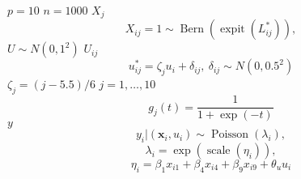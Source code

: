 \documentclass{article}
\begin{document}
$p=10$
$n=1000$
$X_j$
$$
X_{ij}=1 \sim \operatorname{Bern}(\operatorname{expit}(L^*_{ij})), 
$$
$U \sim N(0, 1^2)$
$U_{ij}$
$$
u^*_{ij}=\zeta_j u_i +\delta_{ij}, \ \delta_{ij} \sim N(0, 0.5^2)
$$
$\zeta_j = (j-5.5)/6$
$j=1, \ldots, 10$
$$
g_j(t) = \frac{1}{1+\exp\left(- t\right)}
$$
$y$
$$
y_i|(\mathbf{x}_i, u_i) \sim \operatorname{Poisson}(\lambda_i),
$$
$$
\lambda_i = \operatorname{exp}(\operatorname{scale}(\eta_i)), 
$$
$$
\eta_i = \beta_{1} x_{i1} + \beta_{4} x_{i4} + \beta_{9} x_{i9} + \theta_{u} u_i
$$
\end{document}
